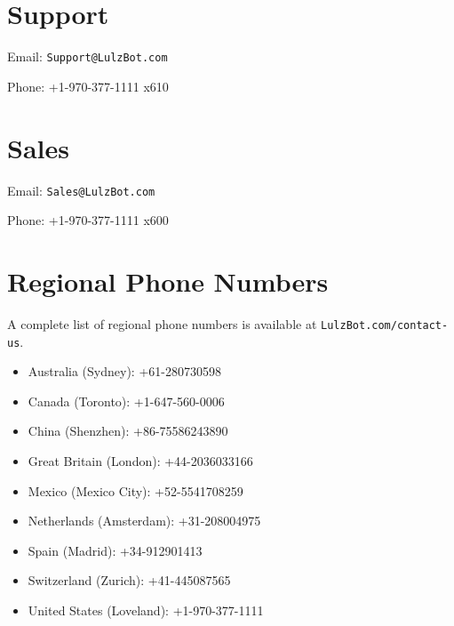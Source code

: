 %
%
%
%
%

\section{Support}
\setlength{\parindent}{0pt}
Email: \texttt{Support@LulzBot.com}

Phone: +1-970-377-1111 x610

\section{Sales}

Email: \texttt{Sales@LulzBot.com}

Phone: +1-970-377-1111 x600

\section{Regional Phone Numbers}\label{regional-phone-numbers}
A complete list of regional phone numbers is available at \texttt{LulzBot.com/contact-us}. 
\begin{itemize}
\item Australia﻿ (Sydney﻿): +61-280730598
\item Canada (Toronto): +1-647-560-0006
\item China (Shenzhen): +86-75586243890
\item Great Britain (London﻿)﻿: +44-2036033166﻿
\item Mexico (Mexico City﻿)﻿: +52-5541708259
\item Netherlands (Amsterdam﻿)﻿: +31-208004975
\item Spain﻿ (Madrid﻿): +34-912901413﻿
\item Switzerland﻿ (Zurich﻿)﻿: +41-445087565
\item United States (Loveland): +1-970-377-1111
\end{itemize}

